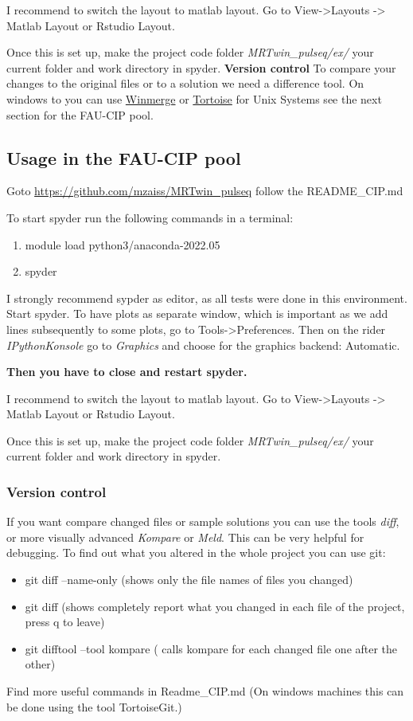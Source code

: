 \documentclass[a4paper,12pt]{extarticle}
\begin{document}
I recommend to switch the layout to matlab layout. Go to View->Layouts -> Matlab Layout or Rstudio Layout.

Once this is set up, make the project code folder \emph{MRTwin\_pulseq/ex/} your current folder and work directory in spyder. 
\textbf{Version control}
To compare your changes to the original files or to a solution we need a difference tool. On windows to you can use \href{https://winmerge.org/}{Winmerge} or \href{https://tortoisegit.org/}{Tortoise} for Unix Systems see the next section for the FAU-CIP pool.

\subsection{Usage in the FAU-CIP pool}\label{sec:spyder_cip}
Goto \href{https://github.com/mzaiss/MRTwin_pulseq}{https://github.com/mzaiss/MRTwin\_pulseq} follow the README\_CIP.md

To start spyder run the following commands in a terminal:
\begin{enumerate}
\item module load python3/anaconda-2022.05
\item spyder
\end{enumerate}

I strongly recommend sypder as editor, as all tests were done in this environment.
Start spyder.
To have plots as separate window, which is important as we add lines subsequently to some plots, go to Tools->Preferences. Then on the rider \emph{IPythonKonsole} go to \emph{Graphics} and choose for the graphics backend: Automatic.

\textbf{Then you have to close and restart spyder.}

I recommend to switch the layout to matlab layout. Go to View->Layouts -> Matlab Layout or Rstudio Layout.

Once this is set up, make the project code folder \emph{MRTwin\_pulseq/ex/} your current folder and work directory in spyder. 

\subsubsection{Version control}
If you want compare changed files or sample solutions you can use the tools \emph{diff}, or more visually advanced \emph{Kompare} or \emph{Meld}. This can be very helpful for debugging.
To find out what you altered in the whole project you can use git:
\begin{itemize}
\item git diff --name-only  (shows only the file names of files you changed)
\item git diff (shows completely report what you changed in each file of the project, press q to leave)
\item git difftool --tool kompare ( calls kompare for each changed file one after the other)
\end{itemize}
Find more useful commands in Readme\_CIP.md
(On windows machines this can be done using the tool TortoiseGit.)
\end{document}
